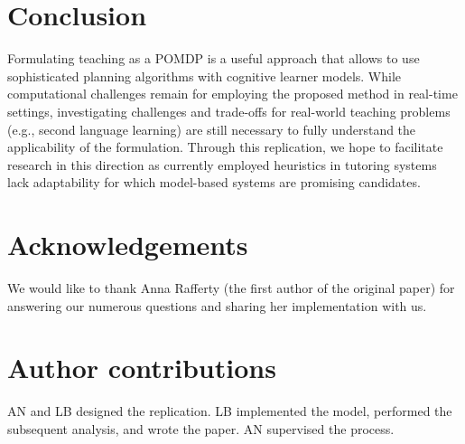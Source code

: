 \section{Conclusion}
Formulating teaching as a POMDP is a useful approach that allows to use sophisticated planning algorithms with cognitive learner models.
While computational challenges remain for employing the proposed method in real-time settings, investigating challenges and trade-offs for real-world teaching problems (e.g., second language learning) are still necessary to fully understand the applicability of the formulation.
Through this replication, we hope to facilitate research in this direction as currently employed heuristics in tutoring systems lack adaptability for which model-based systems are promising candidates. %

\section{Acknowledgements}
We would like to thank Anna Rafferty (the first author of the original paper) for answering our numerous questions and sharing her implementation with us.

\section{Author contributions}
AN and LB designed the replication.
LB implemented the model, performed the subsequent analysis, and wrote the paper. AN supervised the process.
